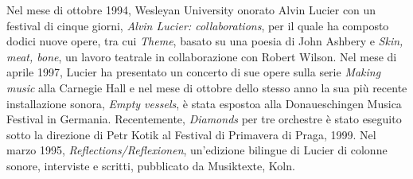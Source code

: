 \documentclass[9pt, twoside, a5paper]{extreport}
\begin{document}
\begin{multicols}{2}
{Nel mese di ottobre 1994, Wesleyan University onorato Alvin Lucier con un festival di cinque giorni, \textit{Alvin Lucier: collaborations}, per il quale ha composto dodici nuove opere, tra cui \textit{Theme}, basato su una poesia di John Ashbery e \textit{Skin, meat, bone}, un lavoro teatrale in collaborazione con Robert Wilson. Nel mese di aprile 1997, Lucier ha presentato un concerto di sue opere sulla serie \textit{Making music} alla Carnegie Hall e nel mese di ottobre dello stesso anno la sua più recente installazione sonora, \textit{Empty vessels}, è stata espostoa alla Donaueschingen Musica Festival in Germania. Recentemente, \textit{Diamonds} per tre orchestre è stato eseguito sotto la direzione di Petr Kotik al Festival di Primavera di Praga, 1999. 
Nel marzo 1995, \textit{Reflections/Reflexionen}, un'edizione bilingue di Lucier di colonne sonore, interviste e scritti, pubblicato da Musiktexte, Koln.}




\end{multicols}
\end{document}
